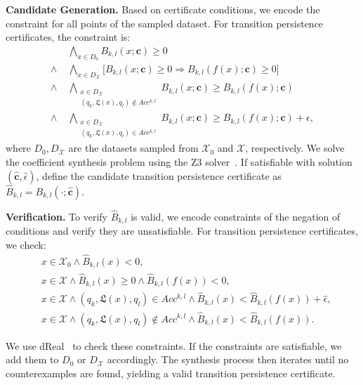\textbf{Candidate Generation.} Based on certificate conditions, we encode the constraint for all points of the sampled dataset.
For transition persistence certificates, the constraint is:
\begin{align}
  & \bigwedge_{x \in D_0} B_{k,l}(x; \mathbf{c}) \geq 0 \label{smt:tp-init} \\ 
  \wedge \; &\bigwedge_{x \in D_{\mathcal{X}}} \big[ B_{k,l}(x; \mathbf{c}) \geq 0 \Rightarrow B_{k,l}(f(x); \mathbf{c}) \geq 0 \big] \label{smt:tp-inv} \\ 
  \wedge \; &\bigwedge_{\substack{x \in D_{\mathcal{X}} \\ (q_k, \mathfrak{L}(x), q_l) \notin Acc^{k,l}}} B_{k,l}(x; \mathbf{c}) \geq B_{k,l}(f(x); \mathbf{c}) \label{smt:tp-non-dec} \\ 
  \wedge \; &\bigwedge_{\substack{x \in D_{\mathcal{X}} \\ (q_k, \mathfrak{L}(x), q_l) \in Acc^{k,l}}} B_{k,l}(x; \mathbf{c}) \geq B_{k,l}(f(x); \mathbf{c}) + \epsilon, \label{smt:tp-dec}
\end{align}
where $D_0, D_{\mathcal{X}}$ are the datasets sampled from $\mathcal{X}_0$ and $\mathcal{X}$, respectively. We solve the coefficient synthesis problem using the Z3 solver~\cite{de2008z3}. If satisfiable with solution $(\hat{\mathbf{c}}, \hat{\epsilon})$, define the candidate transition persistence certificate as $\hat{B}_{k,l} = B_{k,l}(\cdot; \hat{\mathbf{c}})$.

\textbf{Verification.} To verify $\hat{B}_{k,l}$ is valid, we encode constraints of the negation of conditions and
verify they are unsatisfiable. For transition persistence certificates, we check:
\begin{align}
  & x \in \mathcal{X}_0 \land \hat{B}_{k,l}(x) < 0, \label{smt:tp-cex-init} \\ 
  & x \in \mathcal{X} \land \hat{B}_{k,l}(x) \geq 0 \land \hat{B}_{k,l}(f(x)) < 0, \label{smt:tp-cex-inv} \\ 
  & x \in \mathcal{X} \land (q_k, \mathfrak{L}(x), q_l) \in Acc^{k,l} \land \hat{B}_{k,l}(x) < \hat{B}_{k,l}(f(x)) + \hat{\epsilon}, \label{smt:tp-cex-dec} \\ 
  & x \in \mathcal{X} \land (q_k, \mathfrak{L}(x), q_l) \notin Acc^{k,l} \land \hat{B}_{k,l}(x) < \hat{B}_{k,l}(f(x)). \label{smt:tp-cex-non-dec}
\end{align}

We use dReal~\cite{gao2013dreal} to check these constraints. If the constraints are satisfiable, we add them to $D_0$ or $D_{\mathcal{X}}$ accordingly. The synthesis process then iterates until no counterexamples are found, yielding a valid transition persistence certificate.


